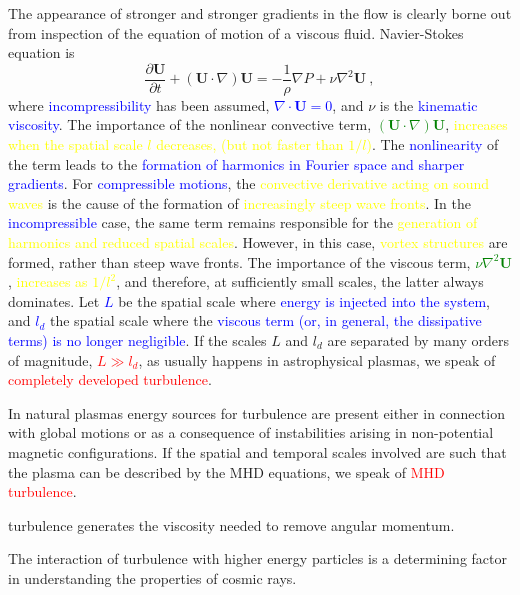 \documentclass[12pt,a4paper]{article}
\renewcommand{\vec}[1]{\boldsymbol{#1}}
\begin{document}
The appearance of stronger and stronger gradients in the flow is clearly borne out from inspection of the equation of motion of a viscous fluid. Navier-Stokes equation is
\begin{equation}
\frac{\partial \vec{U}}{\partial t} + (\vec{U}\cdot \nabla) \vec{U} = -\frac{1}{\rho} \nabla P +\nu \nabla^2 \vec{U} ~,
\end{equation}
where \textcolor{blue}{incompressibility} has been assumed, \textcolor{blue}{$\nabla \cdot \vec{U} = 0$}, and $\nu$ is the \textcolor{blue}{kinematic viscosity}. The importance of the nonlinear convective term, \textcolor{green}{$(\vec{U}\cdot \nabla) \vec{U}$}, \textcolor{yellow}{increases when the spatial scale $l$ decreases, (but not faster than $1/l$)}. The \textcolor{blue}{nonlinearity} of the term leads to the \textcolor{blue}{formation of harmonics in Fourier space and sharper gradients}. For \textcolor{blue}{compressible motions}, the \textcolor{yellow}{convective derivative acting on sound waves} is the cause of the formation of \textcolor{yellow}{increasingly steep wave fronts}. In the \textcolor{blue}{incompressible} case, the same term remains responsible for the \textcolor{yellow}{generation of harmonics and reduced spatial scales}. However, in this case, \textcolor{yellow}{vortex structures} are formed, rather than steep wave fronts. The importance of the viscous term, \textcolor{green}{$\nu \nabla^2 \vec{U}$}, \textcolor{yellow}{increases as $1/l^2$}, and therefore, at sufficiently small scales, the latter always dominates. Let \textcolor{blue}{$L$} be the spatial scale where \textcolor{blue}{energy is injected into the system}, and \textcolor{blue}{$l_d$} the spatial scale where the \textcolor{blue}{viscous term (or, in general, the dissipative terms) is no longer negligible}. If the scales $L$ and $l_d$ are separated by many orders of magnitude, \textcolor{red}{$L \gg l_d$}, as usually happens in astrophysical plasmas, we speak of \textcolor{red}{completely developed turbulence}.

In natural plasmas energy sources for turbulence are present either in connection with global motions or as a consequence of instabilities arising in non-potential magnetic configurations. If the spatial and temporal scales involved are such that the plasma can be described by the MHD equations, we speak of \textcolor{red}{MHD turbulence}. 

turbulence generates the viscosity needed to remove angular momentum. 

The interaction of turbulence with higher energy particles is a determining factor in understanding the properties of cosmic rays.
\end{document}
